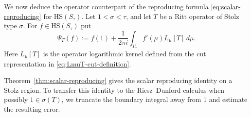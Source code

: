 \documentclass[11pt]{amsart}
\numberwithin{equation}{section}
\theoremstyle{definition}
\theoremstyle{plain}
\newcommand{\HS}{\mathrm{HS}}
\begin{document}

We now deduce the operator counterpart of the reproducing formula 
\eqref{eq:scalar-reproducing} for $\HS(S_\tau).$ 
  Let \(1<\sigma<\tau\), and let \(T\) be a Ritt operator of
Stolz type \(\sigma\).  For \(f\in\HS(S_\tau)\) put
\begin{equation}\label{eq:HS-op-formula}
        \Psi_T(f)
        :=
        f(1)+
        \frac1{2\pi i}
        \int_{\Gamma_\tau}f'(\mu)L_\mu [T]\,d\mu .
\end{equation}
Here \(L_\mu[T]\) is the operator logarithmic kernel defined from the
cut representation in \eqref{eq:LmuT-cut-definition}.  %
  

Theorem~\ref{thm:scalar-reproducing} gives the scalar reproducing
identity on a Stolz region.  To transfer this identity to the
Riesz--Dunford calculus when possibly $1\in\sigma(T)$, we truncate
the boundary integral away from $1$ and estimate the resulting error.
\end{document}
